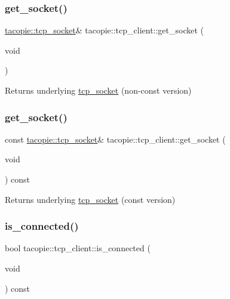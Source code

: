 \subsubsection{\texorpdfstring{get\+\_\+socket()}{get\_socket()}\hspace{0.1cm}{\footnotesize\ttfamily [1/2]}}
{\footnotesize\ttfamily \hyperlink{classtacopie_1_1tcp__socket}{tacopie\+::tcp\+\_\+socket}\& tacopie\+::tcp\+\_\+client\+::get\+\_\+socket (\begin{DoxyParamCaption}\item[{void}]{ }\end{DoxyParamCaption})}

\begin{DoxyReturn}{Returns}
underlying \hyperlink{classtacopie_1_1tcp__socket}{tcp\+\_\+socket} (non-\/const version) 
\end{DoxyReturn}
\mbox{\label{classtacopie_1_1tcp__client_a9cf1f3ccf43f9a0a883a17b15e3668d6}} 
\subsubsection{\texorpdfstring{get\+\_\+socket()}{get\_socket()}\hspace{0.1cm}{\footnotesize\ttfamily [2/2]}}
{\footnotesize\ttfamily const \hyperlink{classtacopie_1_1tcp__socket}{tacopie\+::tcp\+\_\+socket}\& tacopie\+::tcp\+\_\+client\+::get\+\_\+socket (\begin{DoxyParamCaption}\item[{void}]{ }\end{DoxyParamCaption}) const}

\begin{DoxyReturn}{Returns}
underlying \hyperlink{classtacopie_1_1tcp__socket}{tcp\+\_\+socket} (const version) 
\end{DoxyReturn}
\mbox{\label{classtacopie_1_1tcp__client_a9bf568812c8350260843842e7952c8c3}} 
\subsubsection{\texorpdfstring{is\+\_\+connected()}{is\_connected()}}
{\footnotesize\ttfamily bool tacopie\+::tcp\+\_\+client\+::is\+\_\+connected (\begin{DoxyParamCaption}\item[{void}]{ }\end{DoxyParamCaption}) const}

